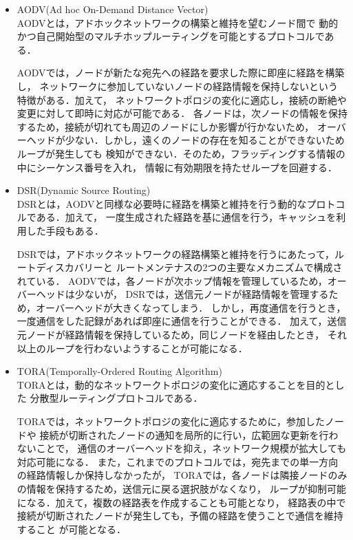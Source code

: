 \documentclass[a4paper, 11pt]{ltjsarticle}
\begin{document}
\begin{itemize}
  \item AODV(Ad hoc On-Demand Distance Vector)\cite{AODV} \\
  AODVとは，アドホックネットワークの構築と維持を望むノード間で
  動的かつ自己開始型のマルチホップルーティングを可能とするプロトコルである．
  
  AODVでは，ノードが新たな宛先への経路を要求した際に即座に経路を構築し，
  ネットワークに参加していないノードの経路情報を保持しないという特徴がある．加えて，
  ネットワークトポロジの変化に適応し，接続の断絶や変更に対して即時に対応が可能である．
  各ノードは，次ノードの情報を保持するため，接続が切れても周辺のノードにしか影響が行かないため，
  オーバーヘッドが少ない．しかし，遠くのノードの存在を知ることができないためループが発生しても
  検知ができない．そのため，フラッディングする情報の中にシーケンス番号を入れ，
  情報に有効期限を持たせループを回避する．\\
  
  \item DSR(Dynamic Source Routing)\cite{DSR} \\
  DSRとは，AODVと同様な必要時に経路を構築と維持を行う動的なプロトコルである．加えて，
  一度生成された経路を基に通信を行う，キャッシュを利用した手段もある．

  DSRでは，アドホックネットワークの経路構築と維持を行うにあたって，ルートディスカバリーと
  ルートメンテナスの2つの主要なメカニズムで構成されている．
  AODVでは，各ノードが次ホップ情報を管理しているため，オーバーヘッドは少ないが，
  DSRでは，送信元ノードが経路情報を管理するため，オーバーヘッドが大きくなってしまう．
  しかし，再度通信を行うとき，一度通信をした記録があれば即座に通信を行うことができる．
  加えて，送信元ノードが経路情報を保持しているため，同じノードを経由したとき，
  それ以上のループを行わないようすることが可能になる．\\
  
  \item TORA(Temporally-Ordered Routing Algorithm)\cite{TORA} \\
  TORAとは，動的なネットワークトポロジの変化に適応することを目的とした
  分散型ルーティングプロトコルである．

  TORAでは，ネットワークトポロジの変化に適応するために，参加したノードや
  接続が切断されたノードの通知を局所的に行い，広範囲な更新を行わないことで，
  通信のオーバーヘッドを抑え，ネットワーク規模が拡大しても対応可能になる．
  また，これまでのプロトコルでは，宛先までの単一方向の経路情報しか保持しなかったが，
  TORAでは，各ノードは隣接ノードのみの情報を保持するため，送信元に戻る選択肢がなくなり，
  ループが抑制可能になる．加えて，複数の経路表を作成することも可能となり，
  経路表の中で接続が切断されたノードが発生しても，予備の経路を使うことで通信を維持すること
  が可能となる．\\


\end{itemize}
\end{document}
